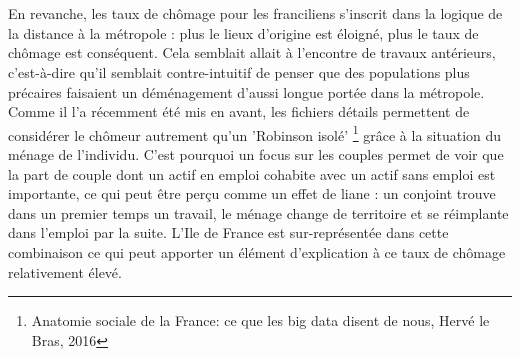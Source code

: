 \documentclass{bredele}
\begin{document}
\\\\
En revanche, les taux de chômage pour les franciliens s’inscrit dans la logique de la distance à la métropole : plus le lieux d’origine est éloigné, plus le taux de chômage est conséquent. Cela semblait allait à l’encontre de travaux antérieurs, c'est-à-dire qu’il semblait contre-intuitif de penser que des populations plus précaires faisaient un déménagement d’aussi longue portée dans la métropole. Comme il l’a récemment été mis en avant, les fichiers détails permettent de considérer le chômeur autrement qu’un 'Robinson isolé' \footnote{Anatomie sociale de la France: ce que les big data disent de nous, Hervé le Bras, 2016} grâce à la situation du ménage de l’individu. C’est pourquoi un focus sur les couples permet de voir que la part de couple dont un actif en emploi cohabite avec un actif sans emploi est importante, ce qui peut être perçu comme un effet de liane : un conjoint trouve dans un premier temps un travail, le ménage change de territoire et se réimplante dans l’emploi par la suite. L’Ile de France est sur-représentée dans cette combinaison ce qui peut apporter un élément d’explication à ce taux de chômage relativement élevé.
\end{document}
